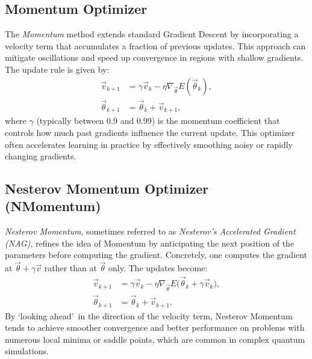 \subsection{Momentum Optimizer}
\label{subsec:momentum}
The \emph{Momentum} method extends standard Gradient Descent by incorporating a velocity term that accumulates a fraction of previous updates. This approach can mitigate oscillations and speed up convergence in regions with shallow gradients. The update rule is given by:
\[
\begin{aligned}
\vec{v}_{k+1} &= \gamma \vec{v}_{k} 
- \eta \nabla_{\vec{\theta}} E(\vec{\theta}_{k}),\\
\vec{\theta}_{k+1} &= \vec{\theta}_{k} + \vec{v}_{k+1},
\end{aligned}
\]
where \(\gamma\) (typically between 0.9 and 0.99) is the momentum coefficient that controls how much past gradients influence the current update. This optimizer often accelerates learning in practice by effectively smoothing noisy or rapidly changing gradients.

\subsection{Nesterov Momentum Optimizer (NMomentum)}
\label{subsec:nmomentum}
\emph{Nesterov Momentum}, sometimes referred to as \emph{Nesterov’s Accelerated Gradient (NAG)}, refines the idea of Momentum by anticipating the next position of the parameters before computing the gradient. Concretely, one computes the gradient at \(\vec{\theta} + \gamma \vec{v}\) rather than at \(\vec{\theta}\) only. The updates become:
\[
\begin{aligned}
\vec{v}_{k+1} &= \gamma \vec{v}_{k} 
- \eta \nabla_{\vec{\theta}}
E\!\big(\vec{\theta}_{k} + \gamma \vec{v}_{k}\big),\\
\vec{\theta}_{k+1} &= \vec{\theta}_{k} + \vec{v}_{k+1}.
\end{aligned}
\]
By \textquoteleft looking ahead\textquoteright\ in the direction of the velocity term, Nesterov Momentum tends to achieve smoother convergence and better performance on problems with numerous local minima or saddle points, which are common in complex quantum simulations.

